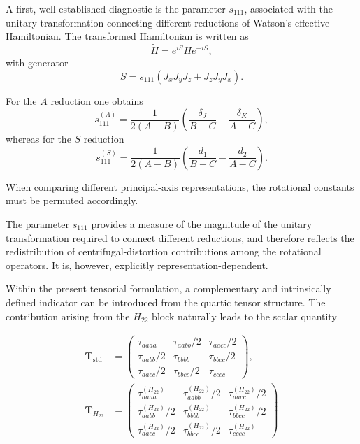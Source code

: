 \documentclass[aip,jcp,reprint,floatfix]{revtex4-2}
\begin{document}
A first, well-established diagnostic is the parameter $s_{111}$,
associated with the unitary transformation connecting different
reductions of Watson's effective Hamiltonian.\cite{Watson1968JCP}
The transformed Hamiltonian is written as
\begin{equation}
\tilde H = e^{iS} H e^{-iS},
\end{equation}
with generator
\begin{equation}
S = s_{111}(J_xJ_yJ_z + J_zJ_yJ_x).
\end{equation}

For the $A$ reduction one obtains
\begin{equation}
s_{111}^{(A)} =
\frac{1}{2(A-B)}
\left(
\frac{\delta_J}{B-C}
-
\frac{\delta_K}{A-C}
\right),
\end{equation}
whereas for the $S$ reduction
\begin{equation}
s_{111}^{(S)} =
\frac{1}{2(A-B)}
\left(
\frac{d_1}{B-C}
-
\frac{d_2}{A-C}
\right).
\end{equation}

When comparing different principal-axis representations, the rotational
constants must be permuted accordingly.

The parameter $s_{111}$ provides a measure of the magnitude of the
unitary transformation required to connect different reductions, and
therefore reflects the redistribution of centrifugal-distortion
contributions among the rotational operators. It is, however,
explicitly representation-dependent.

Within the present tensorial formulation, a complementary and
intrinsically defined indicator can be introduced from the quartic
tensor structure. The contribution arising from the $H_{22}$ block
naturally leads to the scalar quantity

\begin{equation}
\begin{aligned}
\mathbf T_{\mathrm{std}}
&=
\begin{pmatrix}
\tau_{aaaa} & \tau_{aabb}/2 & \tau_{aacc}/2 \\
\tau_{aabb}/2 & \tau_{bbbb} & \tau_{bbcc}/2 \\
\tau_{aacc}/2 & \tau_{bbcc}/2 & \tau_{cccc}
\end{pmatrix},
\\[8pt]
\mathbf T_{H_{22}}
&=
\begin{pmatrix}
\tau^{(H_{22})}_{aaaa} & \tau^{(H_{22})}_{aabb}/2 & \tau^{(H_{22})}_{aacc}/2 \\
\tau^{(H_{22})}_{aabb}/2 & \tau^{(H_{22})}_{bbbb} & \tau^{(H_{22})}_{bbcc}/2 \\
\tau^{(H_{22})}_{aacc}/2 & \tau^{(H_{22})}_{bbcc}/2 & \tau^{(H_{22})}_{cccc}
\end{pmatrix}
\end{aligned}
\end{equation}
\end{document}
